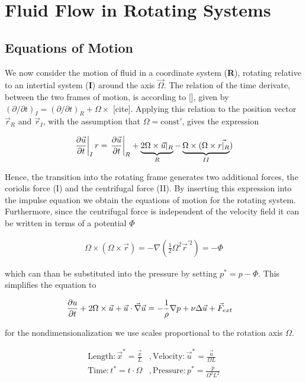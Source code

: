 \newpage

\section{Fluid Flow in Rotating Systems}
\subsection{Equations of Motion}

We now consider the motion of fluid in a coordinate system (\textbf{R}), rotating relative to an intertial system (\textbf{I}) around the axis $\vec{\Omega}$.
The relation of the time derivate, between the two frames of motion, is according to [], given by $(\partial/\partial t)_I = (\partial/\partial t)_R + \Omega \times $ [cite].
Applying this relation to the position vector $\vec{r}_R$ and  $\vec{r}_I$, with the assumption that $\Omega=\mathrm{const'}$, gives the expression

\begin{align}
    \left.\pdn[\vec{u}]{t}\right|_I r= \left.\pdn[\vec{u}]{t}\right|_R   + \underbrace{2\Omega \times \vec{u}|_R}_{R} - \underbrace{\Omega \times (\Omega \times \vec{r|_R}}_{II})
\end{align}

Hence, the transition into the rotating frame generates two additional forces, the coriolis force (I)  and the centrifugal force (II).
By inserting this expression into the impulse equation we obtain the equations of motion for the rotating system.
Furthermore, since the centrifugal force is independent of the velocity field it can be written in terms of a potential $\Phi$

\begin{align}
    \Omega \times (\Omega \times \vec{r}) = - \nabla(\frac{1}{2}\Omega^2\vec{r}^{'2}) = -\Phi
\end{align}

which  can than be substituted into the pressure by setting $p^* = p - \Phi$.
This simplifies the equation to

\begin{align}
    \pdn[u]{t} + 2\Omega \times \vec{u} +  \vec{u} \cdot \vec{\nabla} \vec{u} &= - \frac{1}{\rho} \nabla p + \nu \Delta \vec{u} + \vec{F}_{ext}
\end{align}

for the nondimensionalization we use scales proportional to the rotation axis $\Omega$.

\begin{align}
    \mathrm{Length}  : \vec{x}^* = \frac{\vec{x}}{L}  &, \mathrm{Velocity}: \vec{u}^* = \frac{\vec{u}}{\Omega L}\\
    \mathrm{Time}    : t^* = t \cdot \Omega      &, \mathrm{Pressure}: p^* = \frac{p}{\Omega^2 L^2}
\end{align}

